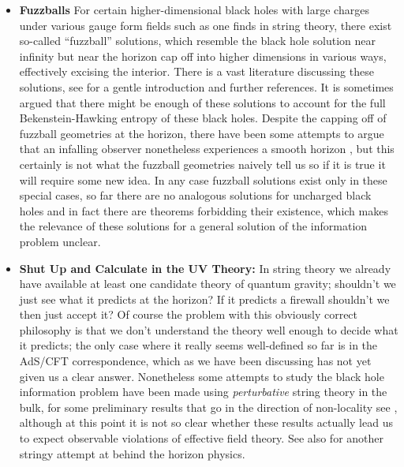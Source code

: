 \documentclass[12pt]{article}
\begin{document}
\begin{itemize}
\item \textbf{Fuzzballs} For certain higher-dimensional black holes with large charges under various gauge form fields such as one finds in string theory, there exist so-called ``fuzzball'' solutions, which resemble the black hole solution near infinity but near the horizon cap off into higher dimensions in various ways, effectively excising the interior.  There is a vast literature discussing these solutions, see \cite{Gibbons:2013tqa} for a gentle introduction and further references.  It is sometimes argued that there might be enough of these solutions to account for the full Bekenstein-Hawking entropy of these black holes.  Despite the capping off of fuzzball geometries at the horizon, there have been some attempts to argue that an infalling observer nonetheless experiences a smooth horizon  \cite{Mathur:2012jk,Mathur:2013gua}, but this certainly is not what the fuzzball geometries naively tell us \cite{Bena:2012zi} so if it is true it will require some new idea.  In any case fuzzball solutions exist only in these special cases, so far there are no analogous solutions for uncharged black holes and in fact there are theorems forbidding their existence, which makes the relevance of these solutions for a general solution of the information problem unclear.
\item \textbf{Shut Up and Calculate in the UV Theory:} In string theory we already have available at least one candidate theory of quantum gravity; shouldn't we just see what it predicts at the horizon?  If it predicts a firewall shouldn't we then just accept it? Of course the problem with this obviously correct philosophy is that we don't understand the theory well enough to decide what it predicts; the only case where it really seems well-defined so far is in the AdS/CFT correspondence, which as we have been discussing has not yet given us a clear answer.  Nonetheless some attempts to study the black hole information problem have been made using \textit{perturbative} string theory in the bulk, for some preliminary results that go in the direction of non-locality see \cite{Lowe:1995ac,Giddings:2007bw,Amati:2007ak,Silverstein:2014yza,Dodelson:2015uoa,Dodelson:2015toa}, although at this point it is not so clear whether these results actually lead us to expect observable violations of effective field theory.  See also \cite{Horowitz:2009wm} for another stringy attempt at behind the horizon physics.  
\end{itemize}
\end{document}
